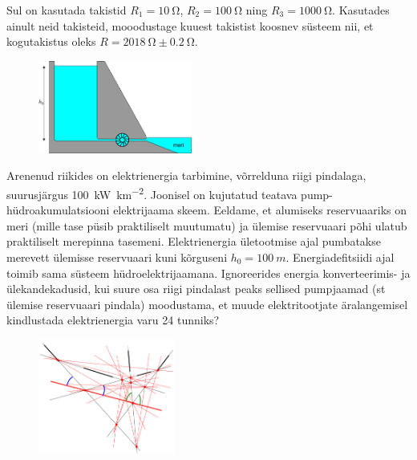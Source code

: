 \documentclass[10pt]{article}
\begin{document}

Sul on kasutada takistid $R_1=\SI{10}{\ohm}$, $R_2=\SI{100}{\ohm}$ ning $R_3=\SI{1000}{\ohm}$. Kasutades ainult neid takisteid, mooodustage kuuest takistist koosnev süsteem nii, et kogutakistus oleks $R=\SI{2018}{\ohm}\pm\SI{0,2}{\ohm}$.
\probend
\bigskip


\begin{figure}
    \vspace{-23pt}
	\includegraphics[width=0.45\textwidth]{2019-lahg-02-yl.pdf}
\end{figure}

Arenenud riikides on elektrienergia tarbimine, võrrelduna riigi pindalaga, suurusjärgus \SI{100}{\kilo\watt\per\kilo\meter\squared}. Joonisel on kujutatud teatava pump-hüdroakumulatsiooni elektrijaama skeem. Eeldame, et alumiseks reservuaariks on meri (mille tase püsib praktiliselt muutumatu) ja ülemise reservuaari põhi ulatub praktiliselt merepinna tasemeni. Elektrienergia ületootmise ajal pumbatakse merevett ülemisse reservuaari kuni kõrguseni $h_0=\SI{100}{m}$. Energiadefitsiidi ajal toimib sama süsteem hüdroelektrijaamana. Ignoreerides energia konverteerimis- ja ülekandekadusid, kui suure osa riigi pindalast peaks sellised pumpjaamad (st ülemise reservuaari pindala) moodustama, et muude elektritootjate äralangemisel kindlustada elektrienergia varu 24 tunniks?
\probend
\bigskip

\setAuthor{}

\begin{figure}
\vspace{-10pt}
	\begin{center}
		\includegraphics[width = 0.4\textwidth]{2019-v2g-02-yl.pdf}
	\end{center}
\end{figure}
\end{document}

